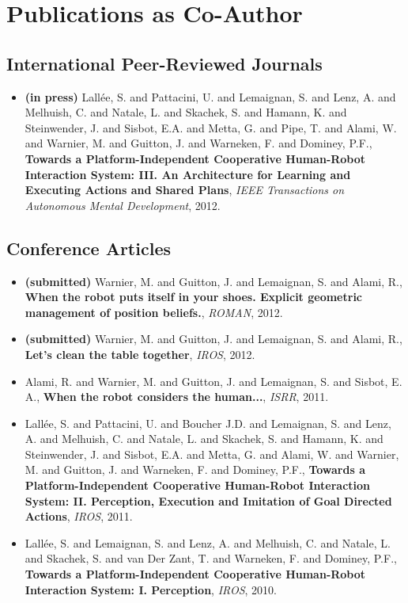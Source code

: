 \section{Publications as Co-Author}

\subsection {International Peer-Reviewed Journals}

\begin{itemize}
    \item{\textbf{(in press)} Lallée, S. and Pattacini, U. and Lemaignan, S. and Lenz, A. and Melhuish, C. and Natale, L. and Skachek, S. and Hamann, K. and Steinwender, J. and Sisbot, E.A. and Metta, G. and Pipe, T. and Alami, W. and Warnier, M. and Guitton, J. and Warneken, F. and Dominey, P.F., \textbf{Towards a Platform-Independent Cooperative Human-Robot Interaction System: III. An Architecture for Learning and Executing Actions and Shared Plans}, \textit{IEEE Transactions on Autonomous Mental Development}, 2012.}
\end{itemize}

\subsection {Conference Articles}

\begin{itemize}
    \item{\textbf{(submitted)} Warnier, M. and Guitton, J. and Lemaignan, S. and Alami, R., \textbf{When the robot puts itself in your shoes. Explicit geometric management of position beliefs.}, \textit{ROMAN}, 2012.}
    \item{\textbf{(submitted)} Warnier, M. and Guitton, J. and Lemaignan, S. and Alami, R., \textbf{Let’s clean the table together}, \textit{IROS}, 2012.}
    \item{Alami, R. and Warnier, M. and Guitton, J. and Lemaignan, S. and Sisbot, E. A., \textbf{When the robot considers the human...}, \textit{ISRR}, 2011.}
    \item{Lallée, S. and Pattacini, U. and Boucher J.D. and Lemaignan, S. and Lenz, A. and Melhuish, C. and Natale, L. and Skachek, S. and Hamann, K. and Steinwender, J. and Sisbot, E.A. and Metta, G. and Alami, W. and Warnier, M. and Guitton, J. and Warneken, F. and Dominey, P.F., \textbf{Towards a Platform-Independent Cooperative Human-Robot Interaction System: II. Perception, Execution and Imitation of Goal Directed Actions}, \textit{IROS}, 2011.} 
    \item{Lallée, S. and Lemaignan, S. and Lenz, A. and Melhuish, C. and Natale, L. and Skachek, S. and van Der Zant, T. and Warneken, F. and Dominey, P.F., \textbf{Towards a Platform-Independent Cooperative Human-Robot Interaction System: I. Perception}, \textit{IROS}, 2010.}
\end{itemize}


